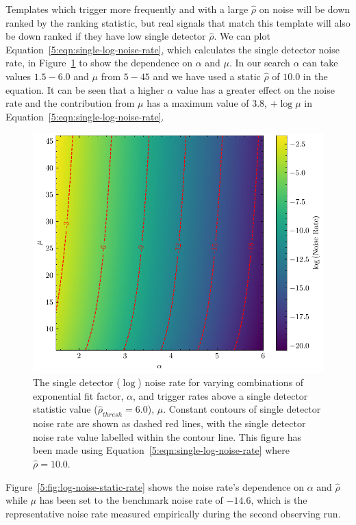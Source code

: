 Templates which trigger more frequently and with a large $\hat{\rho}$ on noise will be down ranked by the ranking statistic, but real \gwadj signals that match this template will also be down ranked if they have low single detector $\hat{\rho}$. We can plot Equation~\ref{5:eqn:single-log-noise-rate}, which calculates the single detector noise rate, in Figure~\ref{5:fig:log-noise-static-snr} to show the dependence on $\alpha$ and $\mu$. In our search $\alpha$ can take values $1.5 - 6.0$ and $\mu$ from $5 - 45$ and we have used a static $\hat{\rho}$ of $10.0$ in the equation. It can be seen that a higher $\alpha$ value has a greater effect on the noise rate and the contribution from $\mu$ has a maximum value of $3.8$, $ + \log\mu$ in Equation~\ref{5:eqn:single-log-noise-rate}.
%
\begin{figure}
    \centering
    \includegraphics[width=1\textwidth]{images/5_pycbclive/plots/lognoise_alpha_rate.pdf}
    \caption{The single detector ($\log$) noise rate for varying combinations of exponential fit factor, $\alpha$, and trigger rates above a single detector statistic value ($\hat{\rho}_{thresh} = 6.0$), $\mu$. Constant contours of single detector noise rate are shown as dashed red lines, with the single detector noise rate value labelled within the contour line. This figure has been made using Equation~\ref{5:eqn:single-log-noise-rate} where $\hat{\rho} = 10.0$.}
    \label{5:fig:log-noise-static-snr}
\end{figure}
%
Figure~\ref{5:fig:log-noise-static-rate} shows the noise rate's dependence on $\alpha$ and $\hat{\rho}$ while $\mu$ has been set to the benchmark noise rate of $-14.6$, which is the representative noise rate measured empirically during the second observing run. 
